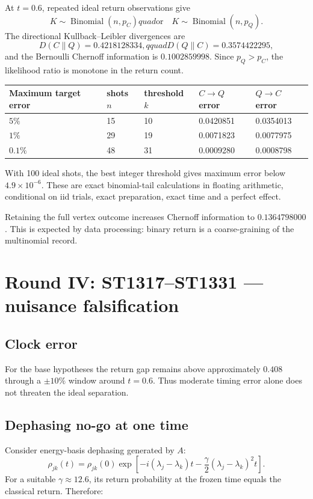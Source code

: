 \documentclass[11pt,a4paper]{article}
\begin{document}
At $t=0.6$, repeated ideal return observations give
\[
 K\sim\operatorname{Binomial}(n,p_C)quad\text{or}\quad
 K\sim\operatorname{Binomial}(n,p_Q).
\]
The directional Kullback--Leibler divergences are
\[
 D(C\|Q)=0.4218128334,qquad D(Q\|C)=0.3574422295,
\]
and the Bernoulli Chernoff information is
$0.1002859998$.  Since $p_Q>p_C$, the likelihood ratio is monotone in the
return count.

\begin{longtable}{@{}p{}p{}p{}p{}p{}@{}}
\toprule
Maximum target error & shots $n$ & threshold $k$ & $C\to Q$ error & $Q\to C$ error \\
\midrule\endhead
$5\%$ & 15 & 10 & 0.0420851 & 0.0354013 \\
$1\%$ & 29 & 19 & 0.0071823 & 0.0077975 \\
$0.1\%$ & 48 & 31 & 0.0009280 & 0.0008798 \\
\bottomrule
\end{longtable}

With 100 ideal shots, the best integer threshold gives maximum error below
$4.9\times10^{-6}$.  These are exact binomial-tail calculations in floating
arithmetic, conditional on iid trials, exact preparation, exact time and a
perfect effect.

Retaining the full vertex outcome increases Chernoff information to
$0.1364798000$.  This is expected by data processing: binary return is a
coarse-graining of the multinomial record.

\section{Round IV: ST1317--ST1331 --- nuisance falsification}

\subsection{Clock error}

For the base hypotheses the return gap remains above approximately $0.408$
through a $\pm10\%$ window around $t=0.6$.  Thus moderate timing error alone
does not threaten the ideal separation.

\subsection{Dephasing no-go at one time}

Consider energy-basis dephasing generated by $A$:
\[
 \rho_{jk}(t)=\rho_{jk}(0)
 \exp\left[-i(\lambda_j-\lambda_k)t
 -\frac\gamma2(\lambda_j-\lambda_k)^2t\right].
\]
For a suitable $\gamma\approx12.6$, its return probability at the frozen time
equals the classical return.  Therefore:
\end{document}
